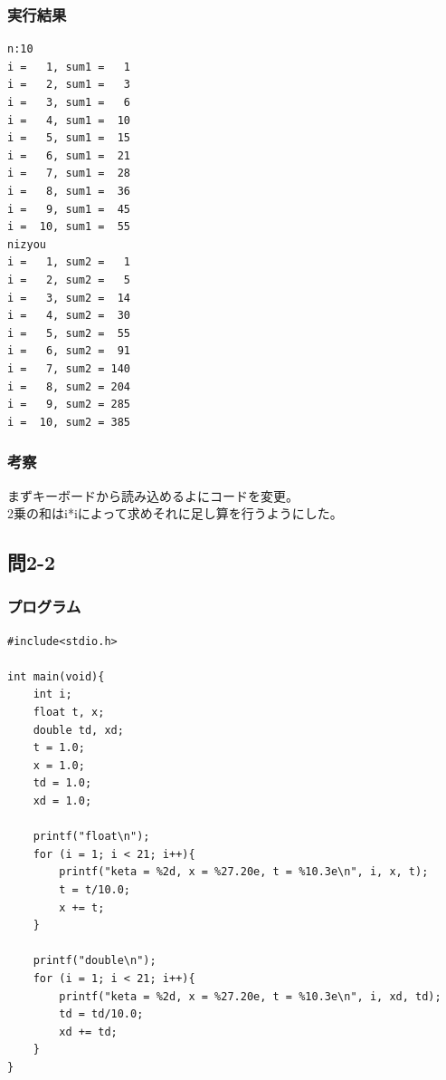 \documentclass{jarticle}
\begin{document}
\subsubsection{実行結果\\}
\begin{breakbox}
\begin{verbatim}
n:10
i =   1, sum1 =   1
i =   2, sum1 =   3
i =   3, sum1 =   6
i =   4, sum1 =  10
i =   5, sum1 =  15
i =   6, sum1 =  21
i =   7, sum1 =  28
i =   8, sum1 =  36
i =   9, sum1 =  45
i =  10, sum1 =  55
nizyou
i =   1, sum2 =   1
i =   2, sum2 =   5
i =   3, sum2 =  14
i =   4, sum2 =  30
i =   5, sum2 =  55
i =   6, sum2 =  91
i =   7, sum2 = 140
i =   8, sum2 = 204
i =   9, sum2 = 285
i =  10, sum2 = 385
\end{verbatim}
\end{breakbox}
\subsubsection{考察\\}
まずキーボードから読み込めるよにコードを変更。\\
2乗の和はi*iによって求めそれに足し算を行うようにした。\\

\subsection{問2-2\\}
\subsubsection{プログラム\\}
\begin{breakbox}
\begin{verbatim}
#include<stdio.h>

int main(void){
    int i;
    float t, x;
    double td, xd;
    t = 1.0;
    x = 1.0;
    td = 1.0;
    xd = 1.0;

    printf("float\n");
    for (i = 1; i < 21; i++){
        printf("keta = %2d, x = %27.20e, t = %10.3e\n", i, x, t);
        t = t/10.0;
        x += t;
    }

    printf("double\n");
    for (i = 1; i < 21; i++){
        printf("keta = %2d, x = %27.20e, t = %10.3e\n", i, xd, td);
        td = td/10.0;
        xd += td;
    }
}
\end{verbatim}
\end{breakbox}
\end{document}
